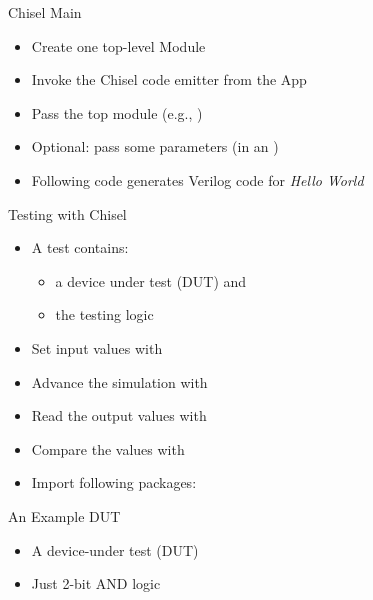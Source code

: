 \begin{frame}[fragile]{Chisel Main}

\begin{itemize}
\item Create one top-level Module
\item Invoke the Chisel code emitter from the App
\item Pass the top module (e.g., )
\item Optional: pass some parameters (in an )
\item Following code generates Verilog code for \emph{Hello World}
\end{itemize}
\end{frame}



\begin{frame}[fragile]{Testing with Chisel}
\begin{itemize}
\item A test contains:
\begin{itemize}
\item a device under test (DUT) and
\item the testing logic
\end{itemize}
\item Set input values with 
\item Advance the simulation with 
\item Read the output values with 
\item Compare the values with 
\item Import following packages:
\end{itemize}
\end{frame}

\begin{frame}[fragile]{An Example DUT}
\begin{itemize}
\item A device-under test (DUT)
\item Just 2-bit AND logic
\end{itemize}
\end{frame}

